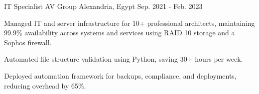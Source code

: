 \begin{cventries}
  \cventry
    {IT Specialist} %
    {AV Group} %
    {Alexandria, Egypt} %
    {Sep. 2021 - Feb. 2023} %
    {
      \begin{cvitems} %
        \item {Managed IT and server infrastructure for 10+ professional architects, maintaining 99.9\% availability across systems and services using RAID 10 storage and a Sophos firewall.}
        \item {Automated file structure validation using Python, saving 30+ hours per week.}
        \item {Deployed automation framework for backups, compliance, and deployments, reducing overhead by 65\%.}
      \end{cvitems}
    }

    

    
   
\end{cventries}

